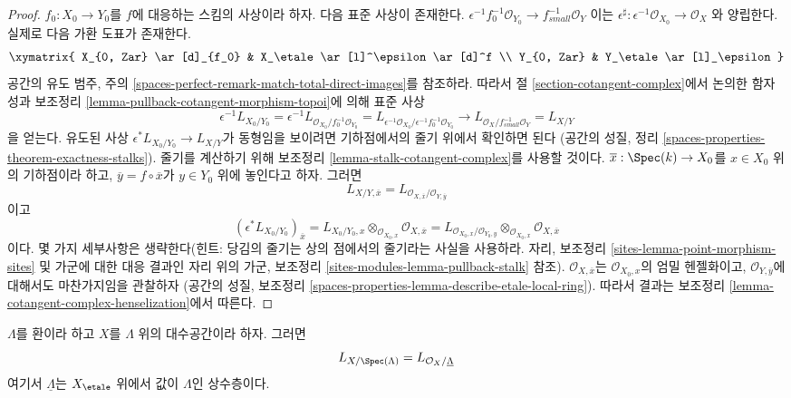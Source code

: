 \begin{proof}
$f_0 : X_0 \to Y_0$를 $f$에 대응하는 스킴의 사상이라 하자.
다음 표준 사상이 존재한다.
$\epsilon^{-1}f_0^{-1}\mathcal{O}_{Y_0} \to f_{small}^{-1}\mathcal{O}_Y$
이는
$\epsilon^\sharp : \epsilon^{-1}\mathcal{O}_{X_0} \to \mathcal{O}_X$
와 양립한다. 실제로 다음 가환 도표가 존재한다.
$$
\xymatrix{
X_{0, Zar} \ar[d]_{f_0} & X_\etale \ar[l]^\epsilon \ar[d]^f \\
Y_{0, Zar} & Y_\etale \ar[l]_\epsilon
}
$$
공간의 유도 범주, 주의
\ref{spaces-perfect-remark-match-total-direct-images}를 참조하라.
따라서 절 \ref{section-cotangent-complex}에서 논의한 함자성과
보조정리 \ref{lemma-pullback-cotangent-morphism-topoi}에 의해 표준 사상
$$
\epsilon^{-1}L_{X_0/Y_0} =
\epsilon^{-1}L_{\mathcal{O}_{X_0}/f_0^{-1}\mathcal{O}_{Y_0}} =
L_{\epsilon^{-1}\mathcal{O}_{X_0}/\epsilon^{-1}f_0^{-1}\mathcal{O}_{Y_0}}
\longrightarrow
L_{\mathcal{O}_X/f^{-1}_{small}\mathcal{O}_Y} = L_{X/Y}
$$
을 얻는다.
유도된 사상 $\epsilon^*L_{X_0/Y_0} \to L_{X/Y}$가 동형임을 보이려면
기하점에서의 줄기 위에서 확인하면 된다
(공간의 성질, 정리
\ref{spaces-properties-theorem-exactness-stalks}).
줄기를 계산하기 위해 보조정리 \ref{lemma-stalk-cotangent-complex}를
사용할 것이다. $\overline{x} : \Spec(k) \to X_0$를 $x \in X_0$ 위의
기하점이라 하고, $\overline{y} = f \circ \overline{x}$가
$y \in Y_0$ 위에 놓인다고 하자. 그러면
$$
L_{X/Y, \overline{x}} =
L_{\mathcal{O}_{X, \overline{x}}/\mathcal{O}_{Y, \overline{y}}}
$$
이고
$$
(\epsilon^*L_{X_0/Y_0})_{\overline{x}} =
L_{X_0/Y_0, x} \otimes_{\mathcal{O}_{X_0, x}}
\mathcal{O}_{X, \overline{x}} =
L_{\mathcal{O}_{X_0, x}/\mathcal{O}_{Y_0, y}}
\otimes_{\mathcal{O}_{X_0, x}} \mathcal{O}_{X, \overline{x}}
$$
이다. 몇 가지 세부사항은 생략한다(힌트: 당김의 줄기는 상의 점에서의
줄기라는 사실을 사용하라. 자리, 보조정리
\ref{sites-lemma-point-morphism-sites} 및 가군에 대한 대응 결과인
자리 위의 가군, 보조정리 \ref{sites-modules-lemma-pullback-stalk} 참조).
$\mathcal{O}_{X, \overline{x}}$는 $\mathcal{O}_{X_0, x}$의 엄밀 헨젤화이고,
$\mathcal{O}_{Y, \overline{y}}$에 대해서도 마찬가지임을 관찰하자
(공간의 성질, 보조정리
\ref{spaces-properties-lemma-describe-etale-local-ring}).
따라서 결과는 보조정리 \ref{lemma-cotangent-complex-henselization}에서 따른다.
\end{proof}

\begin{lemma}
\label{lemma-space-over-ring}
$\Lambda$를 환이라 하고 $X$를 $\Lambda$ 위의 대수공간이라 하자. 그러면
$$
L_{X/\Spec(\Lambda)} = L_{\mathcal{O}_X/\underline{\Lambda}}
$$
여기서 $\underline{\Lambda}$는 $X_\etale$ 위에서 값이 $\Lambda$인 상수층이다.
\end{lemma}

